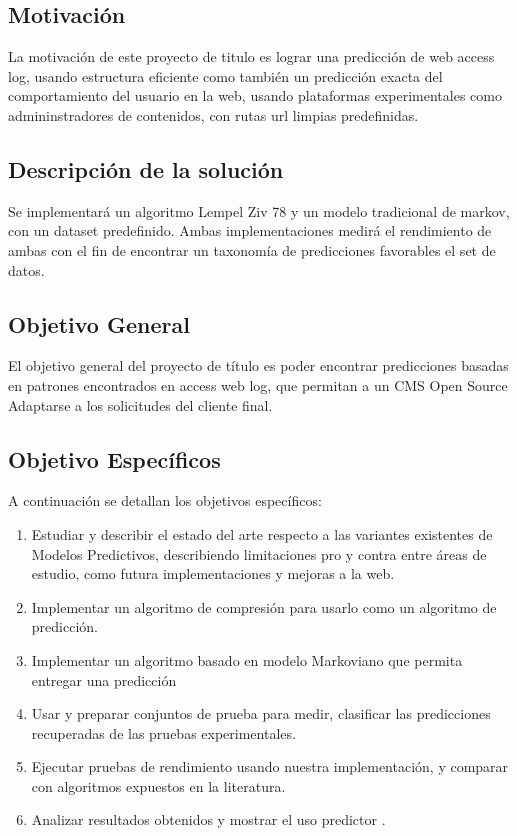 \documentclass{udparticle}
\begin{document}
 




\subsection{Motivación}

La motivación de este proyecto de titulo es lograr una predicción de web access log, usando estructura eficiente
como también un predicción exacta del comportamiento del usuario en la web, usando plataformas experimentales 
como admininstradores de contenidos, con rutas url limpias predefinidas.
 
 
\subsection{Descripción de la solución }
 
 Se implementará un algoritmo Lempel Ziv 78 y un modelo tradicional de markov, con un dataset predefinido.
 Ambas implementaciones medirá el rendimiento de ambas con el fin de encontrar un taxonomía de predicciones favorables
 el set de datos.
 


 
\subsection{Objetivo General}
 
 El objetivo general del proyecto de título es poder encontrar predicciones basadas en patrones encontrados en access web log, que permitan
 a un CMS Open Source Adaptarse a los solicitudes del cliente final.
 
\subsection{Objetivo  Específicos }
 
 A continuación se detallan los objetivos específicos:
 
\begin{enumerate}
	\item Estudiar y describir el estado del arte respecto a las variantes existentes de Modelos Predictivos, describiendo limitaciones pro y contra entre áreas de estudio, como futura implementaciones y mejoras a la web.
	\item Implementar un algoritmo de compresión para usarlo como un algoritmo de predicción.
	\item Implementar un algoritmo basado en modelo Markoviano que permita entregar una predicción
	\item Usar y preparar conjuntos de prueba para medir, clasificar las predicciones recuperadas de las pruebas experimentales.
	\item Ejecutar pruebas de rendimiento usando nuestra implementación, y comparar con algoritmos expuestos en la literatura.
	\item Analizar resultados obtenidos y mostrar el uso predictor .

\end{enumerate}
\end{document}
